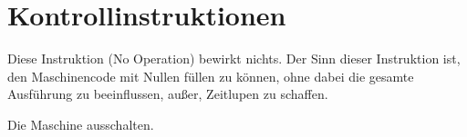 \section{Kontrollinstruktionen}

Diese Instruktion (\glqq No Operation\grqq) bewirkt nichts.
Der Sinn dieser Instruktion ist, den Maschinencode mit Nullen füllen zu können,
ohne dabei die gesamte Ausführung zu beeinflussen, außer, Zeitlupen zu schaffen. 



Die Maschine ausschalten.
